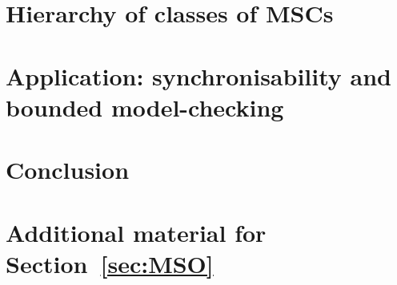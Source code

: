 \documentclass[acmsmall,review,anonymous,screen]{acmart}\settopmatter{printfolios=true,printccs=false,printacmref=true}
\begin{document}
\section{Hierarchy of classes of MSCs} \label{sec:hierarchy}



\section{Application: synchronisability and bounded model-checking}\label{sec:checking}



\section{Conclusion}\label{sec:conc}






\newpage


\newpage

\ifappendix

\appendix

\section{Additional material for Section~\ref{sec:MSO}}
\label{apx:MSO}

\end{document}
